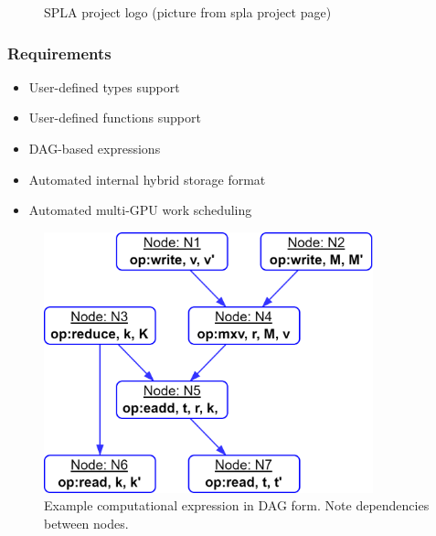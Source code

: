 \documentclass[aspectratio=169,xcolor=table,english]{beamer}
\begin{document}
\begin{frame}[fragile]
\begin{minipage}[m]{0.3\linewidth}
\begin{figure}
            \caption{SPLA project logo (picture from spla project page)}
            \label{fig:logo}
        \end{figure}
    \end{minipage}\hfill
\end{frame}

\begin{frame}[fragile] \frametitle{Requirements}
    \begin{minipage}[m]{0.55\linewidth}
        \begin{itemize}
            \item User-defined types support
            \item User-defined functions support 
            \item DAG-based expressions
            \item Automated internal hybrid storage format
            \item Automated multi-GPU work scheduling
        \end{itemize}
    \end{minipage}\hfill
    \begin{minipage}[m]{0.45\linewidth}
        \begin{figure}
            \centering
            \includegraphics[width=0.85\textwidth]{figures/example_expression.png}
            \caption{Example computational expression in DAG form. Note dependencies between nodes.}
            \label{fig:example_expression}
        \end{figure}
    \end{minipage}
\end{frame}
\end{document}
